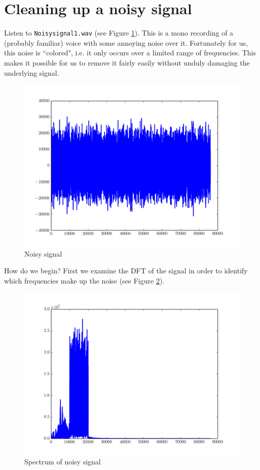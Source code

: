 
\section*{Cleaning up a noisy signal}

Listen to \texttt{Noisysignal1.wav} (see Figure \ref{noisysignal}).
This is a mono recording of a (probably familiar) voice with some annoying noise over it.
Fortunately for us, this noise is ``colored", i.e. it only occurs over a limited range of frequencies.
This makes it possible for us to remove it fairly easily without unduly damaging the underlying signal.
\begin{figure}[ht]\caption{Noisy signal}\label{noisysignal}\centering\includegraphics[width=\textwidth]{noisy}\end{figure}
How do we begin?
First we examine the DFT of the signal in order to identify which frequencies make up the noise (see Figure \ref{noisyspec}).
\begin{figure}[ht]\caption{Spectrum of noisy signal}\label{noisyspec}\centering\includegraphics[width=\textwidth]{noisyspec}\end{figure}
